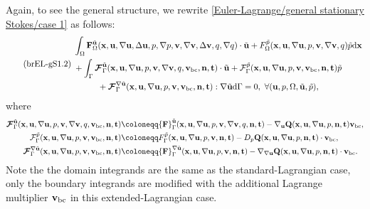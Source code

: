 \documentclass[oneside,11pt]{book}
\numberwithin{equation}{section}
\begin{document}
\begin{enumerate}[leftmargin=0mm]
\begin{itemize}[leftmargin=0in]
        Again, to see the general structure, we rewrite \eqref{Euler-Lagrange/general stationary Stokes/case 1} as follows:
        \begin{equation}
            \label{brief Euler-Lagrange/general stationary Stokes/case 1.2}
            \tag{brEL-gS1.2}
            \left.\begin{split}
                &\int_\Omega {\bf F}_\Omega^{\tilde{\bf u}}({\bf x},{\bf u},\nabla{\bf u},\Delta{\bf u},p,\nabla p,{\bf v},\nabla{\bf v},\Delta{\bf v},q,\nabla q)\cdot\tilde{\bf u} + F_\Omega^{\tilde{p}}({\bf x},{\bf u},\nabla{\bf u},p,{\bf v},\nabla{\bf v},q)\tilde{p}{\rm d}{\bf x}\\
                &+ \int_\Gamma \boldsymbol{\mathcal{F}}_\Gamma^{\tilde{\bf u}}({\bf x},{\bf u},\nabla{\bf u},p,{\bf v},\nabla{\bf v},q,{\bf v}_{\rm bc},{\bf n},{\bf t})\cdot\tilde{\bf u} + \mathcal{F}_\Gamma^{\tilde{p}}({\bf x},{\bf u},\nabla{\bf u},p,{\bf v},{\bf v}_{\rm bc},{\bf n},{\bf t})\tilde{p}\\
                &\hspace{1cm}+ \boldsymbol{\mathcal{F}}_\Gamma^{\nabla\tilde{\bf u}}({\bf x},{\bf u},\nabla{\bf u},p,{\bf v},{\bf v}_{\rm bc},{\bf n},{\bf t}):\nabla\tilde{\bf u}{\rm d}\Gamma = 0,\ \forall({\bf u},p,\Omega,\tilde{\bf u},\tilde{p}),
            \end{split}\right.
        \end{equation}
        where
        \begin{align*}
            \boldsymbol{\mathcal{F}}_\Gamma^{\tilde{\bf u}}({\bf x},{\bf u},\nabla{\bf u},p,{\bf v},\nabla{\bf v},q,{\bf v}_{\rm bc},{\bf n},{\bf t})&\coloneqq{\bf F}_\Gamma^{\tilde{\bf u}}({\bf x},{\bf u},\nabla{\bf u},p,{\bf v},\nabla{\bf v},q,{\bf n},{\bf t}) - \nabla_{\bf u}{\bf Q}({\bf x},{\bf u},\nabla{\bf u},p,{\bf n},{\bf t}){\bf v}_{\rm bc},\\
            \mathcal{F}_\Gamma^{\tilde{p}}({\bf x},{\bf u},\nabla{\bf u},p,{\bf v},{\bf v}_{\rm bc},{\bf n},{\bf t})&\coloneqq F_\Gamma^{\tilde{p}}({\bf x},{\bf u},\nabla{\bf u},p,{\bf v},{\bf n},{\bf t}) - D_p{\bf Q}({\bf x},{\bf u},\nabla{\bf u},p,{\bf n},{\bf t})\cdot{\bf v}_{\rm bc},\\
            \boldsymbol{\mathcal{F}}_\Gamma^{\nabla\tilde{\bf u}}({\bf x},{\bf u},\nabla{\bf u},p,{\bf v},{\bf v}_{\rm bc},{\bf n},{\bf t})&\coloneqq{\bf F}_\Gamma^{\nabla\tilde{\bf u}}({\bf x},{\bf u},\nabla{\bf u},p,{\bf v},{\bf n},{\bf t}) - \nabla_{\nabla{\bf u}}{\bf Q}({\bf x},{\bf u},\nabla{\bf u},p,{\bf n},{\bf t})\cdot{\bf v}_{\rm bc}.
        \end{align*}
        Note the the domain integrands are the same as the standard-Lagrangian case, only the boundary integrands are modified with the additional Lagrange multiplier ${\bf v}_{\rm bc}$ in this extended-Lagrangian case.
        

\end{itemize}
\end{enumerate}
\end{document}
